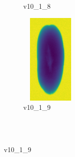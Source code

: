 \documentclass[11pt]{article}
\begin{document}
\begin{figure}
\begin{subfigure}[b]{0.15\textwidth}
        \caption{v10\_1\_8}
         \label{fig:five over x}
     \end{subfigure}
     \hfill
    \begin{subfigure}[b]{0.15\textwidth}
         \centering
         \includegraphics[width=3cm, height=4.5cm]{images/kartofler/v10_1_9_cut.png}
        \caption{v10\_1\_9}
         \label{fig:five over x}
     \end{subfigure} 
     
     
     \\ \\
     

\end{figure}
\end{document}

